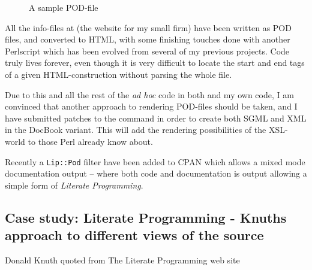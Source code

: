 \begin{figure}[htbp]
  \begin{center}
%
\caption{A sample POD-file}
    \label{fig:sample-pod-file}
  \end{center}
\end{figure}




All the info-files at
 (the
website for my small firm) have been written as POD files,
and converted to HTML, with some finishing touches done with
another Perlscript which has been evolved from
%
{several of my previous projects}.  Code truly lives forever, even
though it is very difficult to locate the start and end tags of a
given HTML-construction without parsing the whole file.

Due to this and all the rest of the \textit{ad hoc} code in both
 and my own code, I am convinced that another
approach to rendering POD-files should be taken, and I have submitted
patches to the  command in order to create
both SGML and XML in the DocBook variant.  This will add the rendering
possibilities of the XSL-world to those Perl already know about.

Recently a \texttt{Lip::Pod} filter have been added to CPAN which
allows a mixed mode documentation output -- where both code
and documentation is output allowing a simple form of \textit{Literate
Programming}.




\subsection{Case study: Literate Programming - Knuths approach to different views
  of the source}
\label{sec:literate-programming}

%
{Donald Knuth}%
{\cite{knuthliterateprogramming}
  quoted from
  The Literate Programming
  web site}

